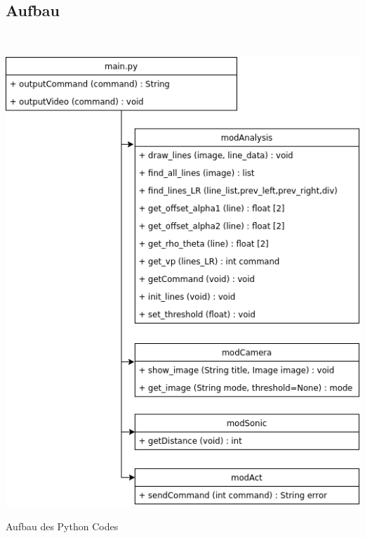   \subsection{Aufbau}
  \ \\
  \begin{minipage}{\columnwidth}
    \makeatletter
    \def\@captype{figure}
    \makeatother
    \centering
    \includegraphics[width=0.8\linewidth]{images/code-flowchart.png}
    \caption{Aufbau des Python Codes}
    \label{fig:image-01}
  \end{minipage}
  \ \\

